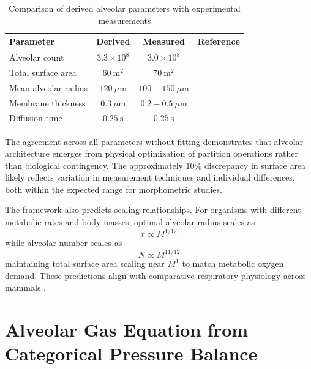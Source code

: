 \documentclass[10pt,twocolumn,a4paper]{article}
\theoremstyle{remark}
\begin{document}
\begin{table}[h]
\centering
\caption{Comparison of derived alveolar parameters with experimental measurements}
\label{tab:alveolar_validation}
\begin{tabular}{lccc}
\toprule
\textbf{Parameter} & \textbf{Derived} & \textbf{Measured} & \textbf{Reference} \\
\midrule
Alveolar count & $3.3 \times 10^{8}$ & $3.0 \times 10^{8}$ & \cite{weibel1963morphometry} \\
Total surface area & $60~\mathrm{m}^{2}$ & $70~\mathrm{m}^{2}$ & \cite{weibel1963morphometry} \\
Mean alveolar radius & $120~\mu\mathrm{m}$ & $100-150~\mu\mathrm{m}$ & \cite{hansen1975surface} \\
Membrane thickness & $0.3~\mu\mathrm{m}$ & $0.2-0.5~\mu\mathrm{m}$ & \cite{weibel1991design} \\
Diffusion time & $0.25~\mathrm{s}$ & $0.25~\mathrm{s}$ & \cite{wagner1996ventilation} \\
\bottomrule
\end{tabular}
\end{table}

The agreement across all parameters without fitting demonstrates that alveolar architecture emerges from physical optimization of partition operations rather than biological contingency. The approximately 10\% discrepancy in surface area likely reflects variation in measurement techniques and individual differences, both within the expected range for morphometric studies.

The framework also predicts scaling relationships. For organisms with different metabolic rates and body masses, optimal alveolar radius scales as
\begin{equation}
r \propto M^{1/12}
\end{equation}
while alveolar number scales as
\begin{equation}
N \propto M^{11/12}
\end{equation}
maintaining total surface area scaling near $M^{1}$ to match metabolic oxygen demand. These predictions align with comparative respiratory physiology across mammals \cite{tenney1970comparative}.

\section{Alveolar Gas Equation from Categorical Pressure Balance}
\label{sec:alveolar_gas}
\end{document}
